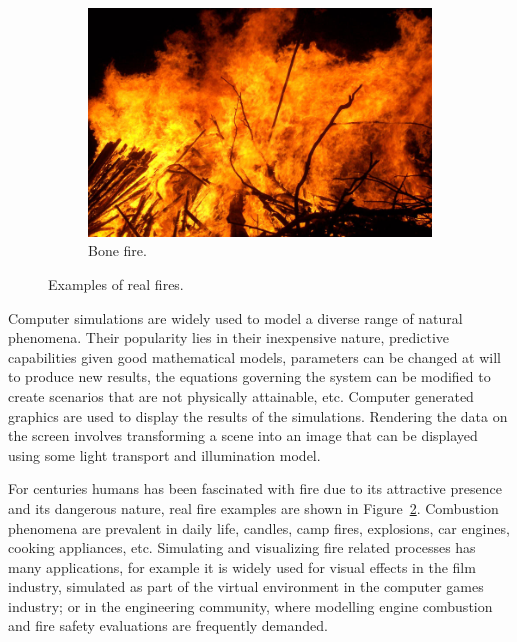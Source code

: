\begin{figure}[htpb!]
        ~ %
        \begin{subfigure}[t]{0.55\textwidth}
                \includegraphics[width=\textwidth]{img/real_fire2}
                \caption{Bone fire\footnotemark.}
                \label{fig:real_fire2}
        \end{subfigure}
        \caption{Examples of real fires.}\label{fig:real_fires}
\end{figure}

Computer simulations are widely used to model a diverse range of natural phenomena.
Their popularity lies in their inexpensive nature, predictive capabilities given good mathematical models, parameters can be changed at will to produce new results, the equations governing the system can be modified to create scenarios that are not physically attainable, etc.
Computer generated graphics are used to display the results of the simulations.
Rendering the data on the screen involves transforming a scene into an image that can be displayed using some light transport and illumination model.

For centuries humans has been fascinated with fire due to its attractive presence and its dangerous nature, real fire examples are shown in Figure~\ref{fig:real_fires}.
Combustion phenomena are prevalent in daily life, candles, camp fires, explosions, car engines, cooking appliances, etc.
Simulating and visualizing fire related processes has many applications, for example it is widely used for visual effects in the film industry, simulated as part of the virtual environment in the computer games industry; or in the engineering community, where modelling engine combustion and fire safety evaluations are frequently demanded.

